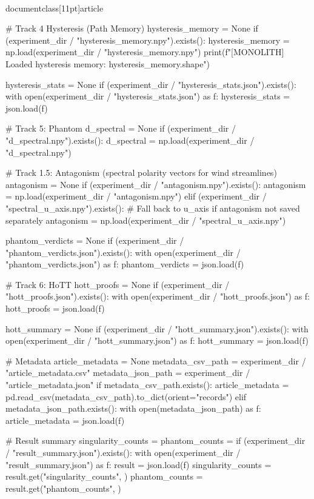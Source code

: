 \\documentclass[11pt]{article}
\begin{document}
\begin{CodeBlock}
    # Track 4 Hysteresis (Path Memory)
    hysteresis_memory = None
    if (experiment_dir / "hysteresis_memory.npy").exists():
        hysteresis_memory = np.load(experiment_dir / "hysteresis_memory.npy")
        print(f"[MONOLITH] Loaded hysteresis memory: {hysteresis_memory.shape}")

    hysteresis_stats = None
    if (experiment_dir / "hysteresis_stats.json").exists():
        with open(experiment_dir / "hysteresis_stats.json") as f:
            hysteresis_stats = json.load(f)

    # Track 5: Phantom
    d_spectral = None
    if (experiment_dir / "d_spectral.npy").exists():
        d_spectral = np.load(experiment_dir / "d_spectral.npy")

    # Track 1.5: Antagonism (spectral polarity vectors for wind streamlines)
    antagonism = None
    if (experiment_dir / "antagonism.npy").exists():
        antagonism = np.load(experiment_dir / "antagonism.npy")
    elif (experiment_dir / "spectral_u_axis.npy").exists():
        # Fall back to u_axis if antagonism not saved separately
        antagonism = np.load(experiment_dir / "spectral_u_axis.npy")

    phantom_verdicts = None
    if (experiment_dir / "phantom_verdicts.json").exists():
        with open(experiment_dir / "phantom_verdicts.json") as f:
            phantom_verdicts = json.load(f)

    # Track 6: HoTT
    hott_proofs = None
    if (experiment_dir / "hott_proofs.json").exists():
        with open(experiment_dir / "hott_proofs.json") as f:
            hott_proofs = json.load(f)

    hott_summary = None
    if (experiment_dir / "hott_summary.json").exists():
        with open(experiment_dir / "hott_summary.json") as f:
            hott_summary = json.load(f)

    # Metadata
    article_metadata = None
    metadata_csv_path = experiment_dir / "article_metadata.csv"
    metadata_json_path = experiment_dir / "article_metadata.json"
    if metadata_csv_path.exists():
        article_metadata = pd.read_csv(metadata_csv_path).to_dict(orient="records")
    elif metadata_json_path.exists():
        with open(metadata_json_path) as f:
            article_metadata = json.load(f)

    # Result summary
    singularity_counts = {}
    phantom_counts = {}
    if (experiment_dir / "result_summary.json").exists():
        with open(experiment_dir / "result_summary.json") as f:
            result = json.load(f)
        singularity_counts = result.get("singularity_counts", {})
        phantom_counts = result.get("phantom_counts", {})


\end{CodeBlock}
\end{document}

